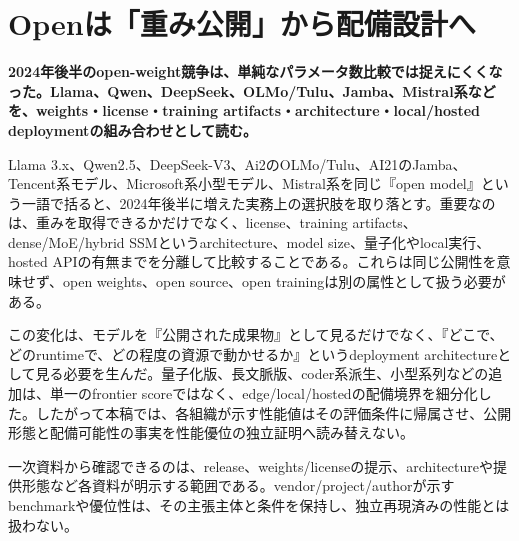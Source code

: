 \section{Openは「重み公開」から配備設計へ}
\noindent\textbf{2024年後半のopen-weight競争は、単純なパラメータ数比較では捉えにくくなった。Llama、Qwen、DeepSeek、OLMo/Tulu、Jamba、Mistral系などを、weights・license・training artifacts・architecture・local/hosted deploymentの組み合わせとして読む。}\autocite{src-042479f9308f,src-8f8555b73e1b,src-e8f0a037900e}

Llama 3.x、Qwen2.5、DeepSeek-V3、Ai2のOLMo/Tulu、AI21のJamba、Tencent系モデル、Microsoft系小型モデル、Mistral系を同じ『open model』という一語で括ると、2024年後半に増えた実務上の選択肢を取り落とす。重要なのは、重みを取得できるかだけでなく、license、training artifacts、dense/MoE/hybrid SSMというarchitecture、model size、量子化やlocal実行、hosted APIの有無までを分離して比較することである。これらは同じ公開性を意味せず、open weights、open source、open trainingは別の属性として扱う必要がある。\autocite{src-042479f9308f,src-16b95c7a8737,src-24aefc391976,src-5b3150b68247,src-7882832e3ea8,src-8f8555b73e1b,src-9d854c1d7239,src-ae11d62632e2,src-dabb3f4afb75,src-e40065b96e7c,src-e8f0a037900e}


この変化は、モデルを『公開された成果物』として見るだけでなく、『どこで、どのruntimeで、どの程度の資源で動かせるか』というdeployment architectureとして見る必要を生んだ。量子化版、長文脈版、coder系派生、小型系列などの追加は、単一のfrontier scoreではなく、edge/local/hostedの配備境界を細分化した。したがって本稿では、各組織が示す性能値はその評価条件に帰属させ、公開形態と配備可能性の事実を性能優位の独立証明へ読み替えない。\autocite{src-22a7228f1409,src-bcbc025369e3,src-ecac5d71389f,src-ee43656ed6da}


\begin{claimboundary}
一次資料から確認できるのは、release、weights/licenseの提示、architectureや提供形態など各資料が明示する範囲である。vendor/project/authorが示すbenchmarkや優位性は、その主張主体と条件を保持し、独立再現済みの性能とは扱わない。\autocite{src-8f8555b73e1b}
\end{claimboundary}
